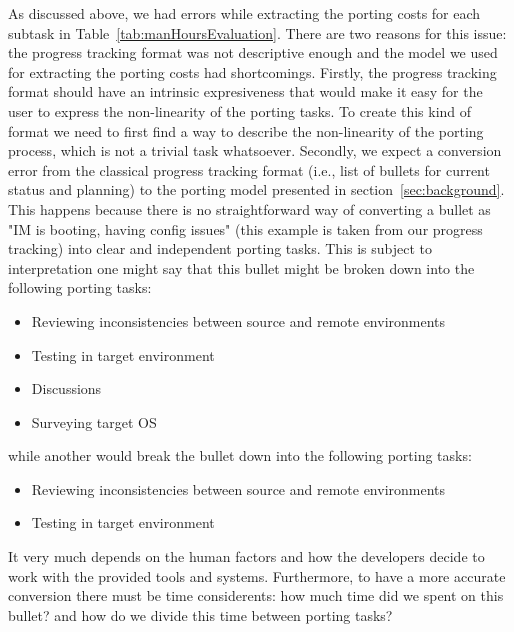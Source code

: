 As discussed above, we had errors while extracting the porting costs for each
subtask in Table~\ref{tab:manHoursEvaluation}. There are two reasons for this
issue: the progress tracking format was not descriptive enough and the model we
used for extracting the porting costs had shortcomings. Firstly, the progress
tracking format should have an intrinsic expresiveness that would make it easy
for the user to express the non-linearity of the porting tasks. To create this
kind of format we need to first find a way to describe the non-linearity of
the porting process, which is not a trivial task whatsoever.  Secondly, we
expect a conversion error from the classical progress tracking format (i.e.,
list of bullets for current status and planning) to the porting model
presented in section~\ref{sec:background}. This happens because there is no
straightforward way of converting a bullet as "IM is booting, having config
issues" (this example is taken from our progress tracking) into clear and
independent porting tasks. This is subject to interpretation one might say
that this bullet might be broken down into the following porting tasks:
\begin{itemize}
        \item Reviewing inconsistencies between source and remote environments
        \item Testing in target environment
        \item Discussions
        \item Surveying target OS
\end{itemize}
while another would break the bullet down into the following porting tasks:
\begin{itemize}
        \item Reviewing inconsistencies between source and remote environments
        \item Testing in target environment
\end{itemize}
It very much depends on the human factors and how the developers decide to work
with the provided tools and systems. Furthermore, to have a more accurate
conversion there must be time considerents: how much time did we spent on this
bullet? and how do we divide this time between porting tasks?


